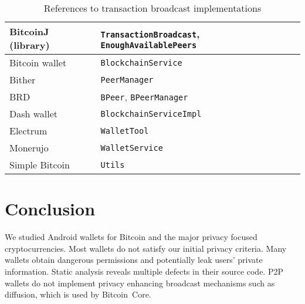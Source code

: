 \begin{table}
	\normalsize
	\caption{References to transaction broadcast implementations}
	\centering
	\begin{tabular}{ | l | l | }
		\hline
		BitcoinJ (library) & \texttt{TransactionBroadcast}, \texttt{EnoughAvailablePeers}  \\
		\hline
		Bitcoin wallet & \texttt{BlockchainService} \\    %
		\hline
		Bither & \texttt{PeerManager} \\    %
		\hline
		BRD & \texttt{BPeer}, \texttt{BPeerManager} \\
		\hline
		Dash wallet & \texttt{BlockchainServiceImpl} \\
		\hline
		Electrum & \texttt{WalletTool} \\
		\hline
		Monerujo & \texttt{WalletService} \\    %
		\hline
		Simple Bitcoin & \texttt{Utils} \\  %
		\hline
	\end{tabular}
	\label{tab:source-code}
\end{table}

\section{Conclusion} \label{section:Ch04_Conclusion}

We studied Android wallets for Bitcoin and the major privacy focused cryptocurrencies.
Most wallets do not satisfy our initial privacy criteria.
Many wallets obtain dangerous permissions and potentially leak users' private information.
Static analysis reveals multiple defects in their source code.
P2P wallets do not implement privacy enhancing broadcast mechanisms such as diffusion, which is used by Bitcoin~Core.

